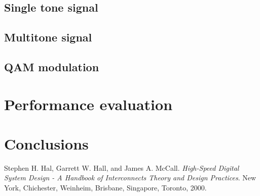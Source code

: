 \documentclass[en,printmode]{mgr}
\begin{document}
	\section{Single tone signal}
	\section{Multitone signal}
	\section{QAM modulation}
	
\chapter{Performance evaluation}

\chapter{ Conclusions}



\begin{thebibliography}{9}
Stephen H. Hal, Garrett W. Hall, and James A. McCall. 
\textit{High-Speed Digital System Design - A Handbook of Interconnects Theory and Design Practices}.
New York, Chichester, Weinheim, Brisbane, Singapore, Toronto, 2000.


\end{thebibliography}
\end{document}
